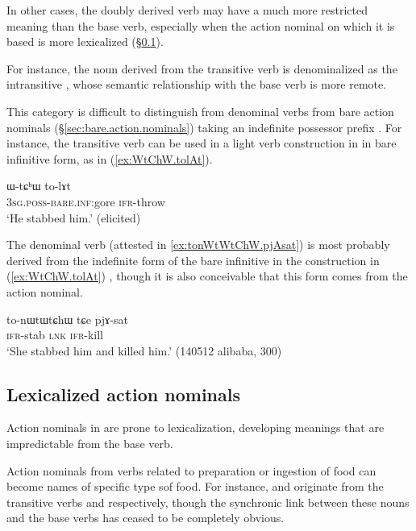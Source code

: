 In other cases, the doubly derived verb may have a much more restricted meaning than the base verb, especially when the action nominal on which it is based is more lexicalized (§\ref{sec:lexicalized.action.nominals}). 

For instance, the noun  derived from the transitive verb  is denominalized as the intransitive , whose semantic relationship with the base verb is more remote.

This category is difficult to distinguish from denominal verbs from bare action nominals (§\ref{sec:bare.action.nominals}) taking an indefinite possessor prefix . For instance, the transitive verb  can be used in a light verb construction in  in bare infinitive form, as in (\ref{ex:WtChW.tolAt}).

\begin{exe}
\ex \label{ex:WtChW.tolAt}
\gll  ɯ-tɕʰɯ to-lɤt \\
\textsc{3sg}.\textsc{poss}-\textsc{bare}.\textsc{inf}:gore \textsc{ifr}-throw \\
\glt `He stabbed him.' (elicited)
\end{exe}

The denominal verb  (attested in \ref{ex:tonWtWtChW.pjAsat}) is most probably derived from the indefinite form  of the bare infinitive in the construction in (\ref{ex:WtChW.tolAt}) , though it is also conceivable that this form comes from the action nominal.

\begin{exe}
\ex \label{ex:tonWtWtChW.pjAsat}
\gll  to-nɯtɯtɕhɯ tɕe pjɤ-sat \\
\textsc{ifr}-stab \textsc{lnk} \textsc{ifr}-kill \\
\glt `She stabbed him and killed him.' (140512 alibaba, 300)
\end{exe}

\subsection{Lexicalized action nominals}  \label{sec:lexicalized.action.nominals}
Action nominals in  are prone to lexicalization, developing meanings that are impredictable from the base verb.

Action nominals from verbs related to preparation or ingestion of food can become names of specific type sof food. For instance,  and  originate from the transitive verbs  and  respectively, though the synchronic link between these nouns and the base verbs has ceased to be completely obvious.



